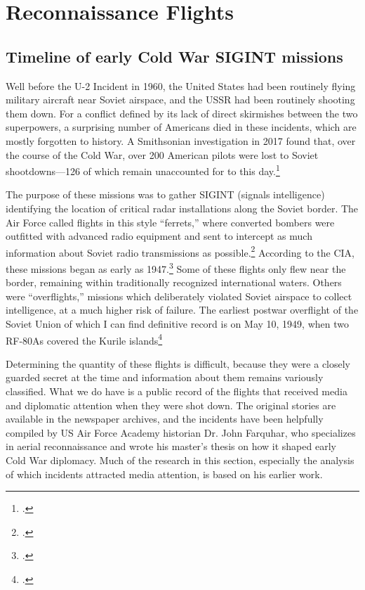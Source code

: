 \documentclass[12pt]{article}
\begin{document}
\section{Reconnaissance Flights}
\subsection{Timeline of early Cold War SIGINT missions}
Well before the U-2 Incident in 1960, the United States had been routinely flying military aircraft near Soviet airspace, and the USSR had been routinely shooting them down. For a conflict defined by its lack of direct skirmishes between the two superpowers, a surprising number of Americans died in these incidents, which are mostly forgotten to history. A Smithsonian investigation in 2017 found that, over the course of the Cold War, over 200 American pilots were lost to Soviet shootdowns---126 of which remain unaccounted for to this day.\footcite{glenshaw_secret_2017}

The purpose of these missions was to gather SIGINT (signals intelligence) identifying the location of critical radar installations along the Soviet border. The Air Force called flights in this style ``ferrets,''  where converted bombers were outfitted with advanced radio equipment and sent to intercept as much information about Soviet radio transmissions as possible.\footcite[p.~4]{peterson_maybe_1993} According to the CIA, these missions began as early as 1947.\footcite[p.~4]{peterson_maybe_1993} Some of these flights only flew near the border, remaining within traditionally recognized international waters. Others were ``overflights,'' missions which deliberately violated Soviet airspace to collect intelligence, at a much higher risk of failure. The earliest postwar overflight of the Soviet Union of which I can find definitive record is on May 10, 1949, when two RF-80As covered the Kurile islands\footcite[p.~8]{peebles_shadow_2000}

Determining the quantity of these flights is difficult, because they were a closely guarded secret at the time and information about them remains variously classified. What we do have is a public record of the flights that received media and diplomatic attention when they were shot down. The original stories are available in the newspaper archives, and the incidents have been helpfully compiled by US Air Force Academy historian Dr. John Farquhar, who specializes in aerial reconnaissance and wrote his master's thesis on how it shaped early Cold War diplomacy. Much of the research in this section, especially the analysis of which incidents attracted media attention, is based on his earlier work.
\newline
\end{document}
